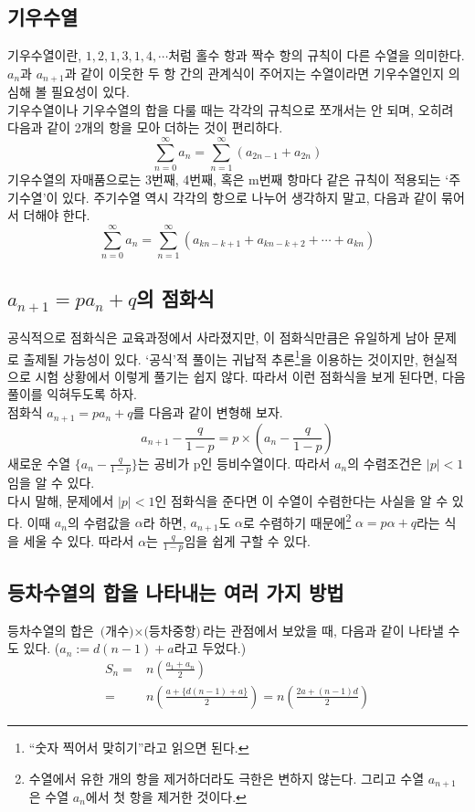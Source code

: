 \documentclass{scrartcl}
\newcommand{\infsum}[1]{\sum^\infty_{#1}}
\begin{document}
\subsection{기우수열}
기우수열이란, \(1, 2, 1, 3, 1, 4,\cdots\)처럼 홀수 항과 짝수 항의 규칙이 다른 수열을 의미한다. \(a_n\)과 \(a_{n+1}\)과 같이 이웃한 두 항 간의 관계식이 주어지는 수열이라면 기우수열인지 의심해 볼 필요성이 있다.\\[1\baselineskip]
기우수열이나 기우수열의 합을 다룰 때는 각각의 규칙으로 쪼개서는 안 되며, 오히려 다음과 같이 2개의 항을 모아 더하는 것이 편리하다.
\[
\infsum{n=0}a_n =\infsum{n=1}(a_{2n-1}+a_{2n})
\]
기우수열의 자매품으로는 3번째, 4번째, 혹은 m번째 항마다 같은 규칙이 적용되는 `주기수열'이 있다. 주기수열 역시 각각의 항으로 나누어 생각하지 말고, 다음과 같이 묶어서 더해야 한다.
\[
\infsum{n=0}a_n =\infsum{n=1}(a_{kn-k+1}+a_{kn-k+2}+\cdots+a_{kn})
\]
\subsection{\texorpdfstring{\(a_{n+1} = pa_n+q\)}꼴의 점화식}
공식적으로 점화식은 교육과정에서 사라졌지만, 이 점화식만큼은 유일하게 남아 문제로 출제될 가능성이 있다. `공식'적 풀이는 귀납적 추론\footnote{``숫자 찍어서 맞히기''라고 읽으면 된다.}을 이용하는 것이지만, 현실적으로 시험 상황에서 이렇게 풀기는 쉽지 않다. 따라서 이런 점화식을 보게 된다면, 다음 풀이를 익혀두도록 하자.
\\[1\baselineskip]
점화식 \(a_{n+1} = pa_n+q\)를 다음과 같이 변형해 보자.
\[
a_{n+1}-\frac{q}{1-p} = p\times(a_n-\frac{q}{1-p})
\]
새로운 수열 \(\{a_n-\frac{q}{1-p}\}\)는 공비가 p인 등비수열이다. 따라서 \(a_n\)의 수렴조건은 \(|p|<1\)임을 알 수 있다.
\\[1\baselineskip]
다시 말해, 문제에서 \(|p|<1\)인 점화식을 준다면 이 수열이 수렴한다는 사실을 알 수 있다. 이때 \(a_n\)의 수렴값을 \(\alpha\)라 하면, \(a_{n+1}\)도 \(\alpha\)로 수렴하기 때문에\footnote{수열에서 유한 개의 항을 제거하더라도 극한은 변하지 않는다. 그리고 수열 \(a_{n+1}\)은 수열 \(a_n\)에서 첫 항을 제거한 것이다.} \(\alpha = p\alpha + q\)라는 식을 세울 수 있다. 따라서 \(\alpha\)는 \(\frac{q}{1-p}\)임을 쉽게 구할 수 있다.

\subsection{등차수열의 합을 나타내는 여러 가지 방법}
등차수열의 합은 \(\text{(개수)}\times\text{(등차중항)}\)라는 관점에서 보았을 때, 다음과 같이 나타낼 수도 있다. (\(a_n:=d(n-1)+a\)라고 두었다.)
\begin{align*}
S_n=&n\left(\frac{a_1+a_n}{2}\right) \\
=&n\left(\frac{a+\{d(n-1)+a\}}{2}\right)=n\left(\frac{2a+(n-1)d}{2}\right)
\end{align*}
\end{document}
